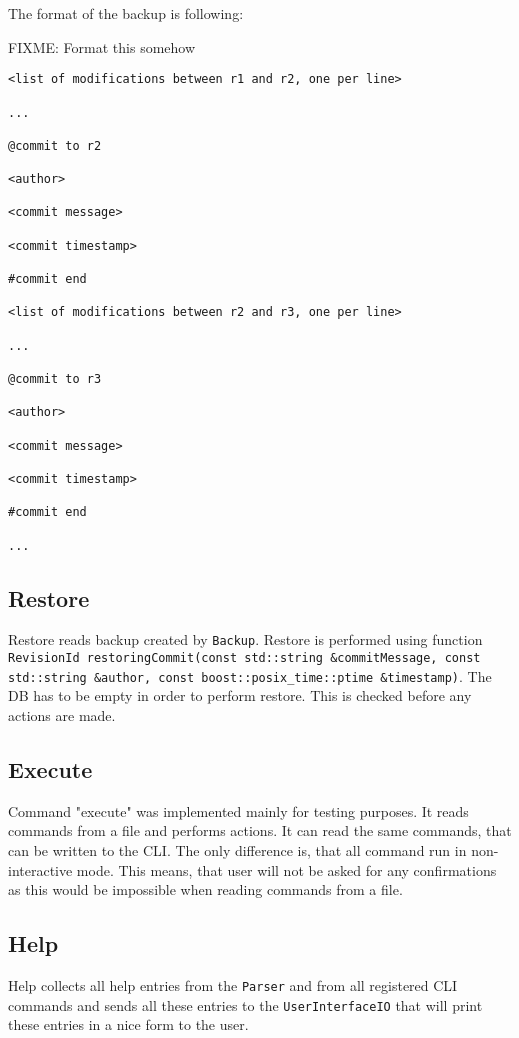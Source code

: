 \documentclass[deska]{subfiles}
\begin{document}
The format of the backup is following:

FIXME: Format this somehow

\begin{verbatim}
<list of modifications between r1 and r2, one per line>

...

@commit to r2

<author>

<commit message>

<commit timestamp>

#commit end

<list of modifications between r2 and r3, one per line>

...

@commit to r3

<author>

<commit message>

<commit timestamp>

#commit end

...
\end{verbatim}

\subsection{Restore}

Restore reads backup created by {\tt Backup}. Restore is performed using function {\tt RevisionId restoringCommit(const
std::string \&commitMessage, const std::string \&author, const boost::posix\_time::ptime \&timestamp)}. The DB has to be empty
in order to perform restore. This is checked before any actions are made.

\subsection{Execute}

Command "execute" was implemented mainly for testing purposes. It reads commands from a file and performs actions. It
can read the same commands, that can be written to the CLI. The only difference is, that all command run in non-interactive
mode. This means, that user will not be asked for any confirmations as this would be impossible when reading commands from
a file.

\subsection{Help}

Help collects all help entries from the {\tt Parser} and from all registered CLI commands and sends all these entries to the
{\tt UserInterfaceIO} that will print these entries in a nice form to the user.
\end{document}
